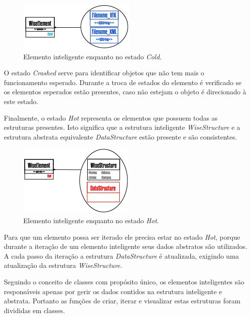 \documentclass[
        english,			
        brazil			        %
        ,<...>]{abntbibufjf}
\begin{document}
\begin{figure}[!htbp]
	\centering
	\includegraphics[scale=1]{Figures/WiseElementCold.png}
	\caption{Elemento inteligente enquanto no estado \textit{Cold}.}
	\label{fig5:wiselementcold}
\end{figure}

O estado \textit{Crashed} serve para identificar objetos que não tem mais o funcionamento esperado. Durante a troca de estados do elemento é verificado se os elementos esperados estão presentes, caso não estejam o objeto é direcionado à este estado.

Finalmente, o estado \textit{Hot} representa os elementos que possuem todas as estruturas presentes. Isto significa que a estrutura inteligente \textit{WiseStructure} e a estrutura abstrata equivalente \textit{DataStructure} estão presente e são consistentes.

\begin{figure}[!htbp]
	\centering
	\includegraphics[scale=1]{Figures/WiseElementHot.png}
	\caption{Elemento inteligente enquanto no estado \textit{Hot}.}
	\label{fig6:wiseelementhot}
\end{figure}

Para que um elemento possa ser iterado ele precisa estar no estado \textit{Hot}, porque durante a iteração de um elemento inteligente seus dados abstratos são utilizados. A cada passo da iteração a estrutura \textit{DataStructure} é atualizada, exigindo uma atualização da estrutura \textit{WiseStructure}.

Seguindo o conceito de classes com propósito único, os elementos inteligentes são responsáveis apenas por gerir os dados contidos na estrutura inteligente e abstrata. Portanto as funções de criar, iterar e visualizar estas estruturas foram divididas em classes.

\end{document}

